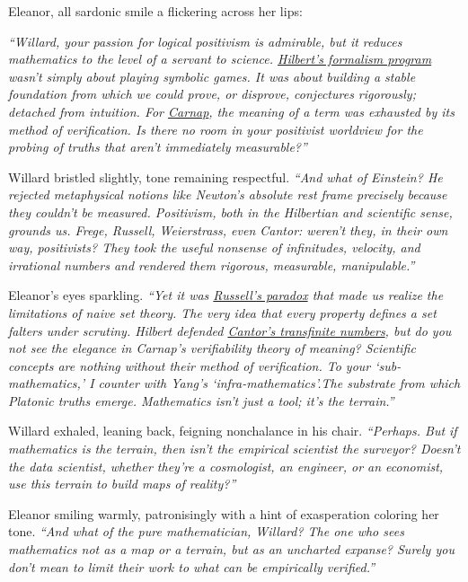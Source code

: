 Eleanor, all sardonic smile a flickering across her lips:

\textit{“Willard, your passion for logical positivism is admirable, but it reduces mathematics to the level of a servant to science. \href{https://plato.stanford.edu/entries/hilbert-program/}{Hilbert’s formalism program} wasn’t simply about playing symbolic games. It was about building a stable foundation from which we could prove, or disprove, conjectures rigorously; detached from intuition. For \href{https://www.phil.cmu.edu/projects/carnap/editorial/latex_pdf/1936-10a.pdf}{Carnap}, the meaning of a term was exhausted by its method of verification. Is there no room in your positivist worldview for the probing of truths that aren’t immediately measurable?”}

Willard bristled slightly, tone remaining respectful. \textit{“And what of Einstein? He rejected metaphysical notions like Newton’s absolute rest frame precisely because they couldn’t be measured. Positivism, both in the Hilbertian and scientific sense, grounds us. Frege, Russell, Weierstrass, even Cantor: weren’t they, in their own way, positivists? They took the useful nonsense of infinitudes, velocity, and irrational numbers and rendered them rigorous, measurable, manipulable.”}

Eleanor’s eyes sparkling. \textit{“Yet it was \href{https://plato.stanford.edu/entries/russell-paradox/}{Russell’s paradox} that made us realize the limitations of naive set theory. The very idea that every property defines a set falters under scrutiny. Hilbert defended \href{https://webhomes.maths.ed.ac.uk/~v1ranick/papers/cantor1.pdf}{Cantor’s transfinite numbers}, but do you not see the elegance in Carnap’s verifiability theory of meaning? Scientific concepts are nothing without their method of verification. To your ‘sub-mathematics,’ I counter with Yang’s ‘infra-mathematics’.The substrate from which Platonic truths emerge. Mathematics isn’t just a tool; it’s the terrain.”}

Willard exhaled, leaning back, feigning nonchalance in his chair. \textit{“Perhaps. But if mathematics is the terrain, then isn’t the empirical scientist the surveyor? Doesn’t the data scientist, whether they’re a cosmologist, an engineer, or an economist, use this terrain to build maps of reality?”}

\smallskip
Eleanor smiling warmly, patronisingly with a hint of exasperation coloring her tone. \textit{“And what of the pure mathematician, Willard? The one who sees mathematics not as a map or a terrain, but as an uncharted expanse? Surely you don’t mean to limit their work to what can be empirically verified.”}

